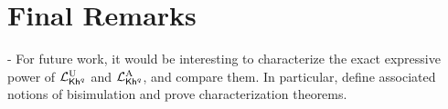 \section{Final Remarks}

- For future work, it would be interesting to characterize the exact expressive power of ${\mathcal{L}^{\mathrm{U}}_{{\mathsf{Kh}}^q}}$ and ${\mathcal{L}^{\mathrm{A}}_{{\mathsf{Kh}}^q}}$, and compare them. In particular, define associated notions of bisimulation and prove characterization theorems.